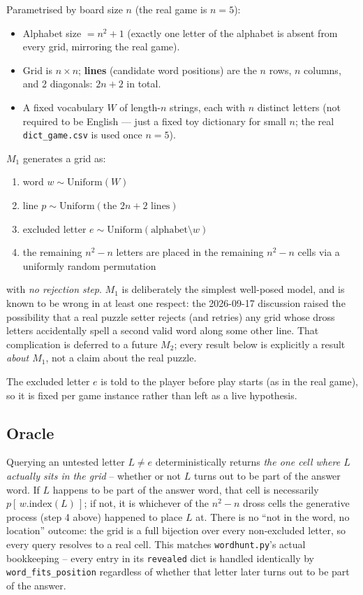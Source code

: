 \documentclass[11pt]{article}
\begin{document}
Parametrised by board size $n$ (the real game is $n=5$):
\begin{itemize}
  \item Alphabet size $= n^2+1$ (exactly one letter of the alphabet is
  absent from every grid, mirroring the real game).
  \item Grid is $n \times n$; \textbf{lines} (candidate word positions) are
  the $n$ rows, $n$ columns, and 2 diagonals: $2n+2$ in total.
  \item A fixed vocabulary $W$ of length-$n$ strings, each with $n$ distinct
  letters (not required to be English --- just a fixed toy dictionary for
  small $n$; the real \texttt{dict\_game.csv} is used once $n=5$).
\end{itemize}

$M_1$ generates a grid as:
\begin{enumerate}
  \item word $w \sim \mathrm{Uniform}(W)$
  \item line $p \sim \mathrm{Uniform}(\text{the } 2n+2 \text{ lines})$
  \item excluded letter $e \sim \mathrm{Uniform}(\text{alphabet} \setminus w)$
  \item the remaining $n^2-n$ letters are placed in the remaining $n^2-n$
  cells via a uniformly random permutation
\end{enumerate}
with \emph{no rejection step}. $M_1$ is deliberately the simplest
well-posed model, and is known to be wrong in at least one respect: the
2026-09-17 discussion raised the possibility that a real puzzle setter
rejects (and retries) any grid whose dross letters accidentally spell a
second valid word along some other line. That complication is deferred to
a future $M_2$; every result below is explicitly a result \emph{about
$M_1$}, not a claim about the real puzzle.

The excluded letter $e$ is told to the player before play starts (as in the
real game), so it is fixed per game instance rather than left as a live
hypothesis.

\subsection{Oracle}
\label{sec:oracle-fix}

Querying an untested letter $L \ne e$ deterministically returns \emph{the
one cell where $L$ actually sits in the grid} -- whether or not $L$ turns
out to be part of the answer word. If $L$ happens to be part of the answer
word, that cell is necessarily $p[\,w.\mathrm{index}(L)\,]$; if not, it is
whichever of the $n^2-n$ dross cells the generative process (step 4 above)
happened to place $L$ at. There is no ``not in the word, no location''
outcome: the grid is a full bijection over every non-excluded letter, so
every query resolves to a real cell. This matches \texttt{wordhunt.py}'s
actual bookkeeping -- every entry in its \texttt{revealed} dict is handled
identically by \texttt{word\_fits\_position} regardless of whether that
letter later turns out to be part of the answer.
\end{document}
